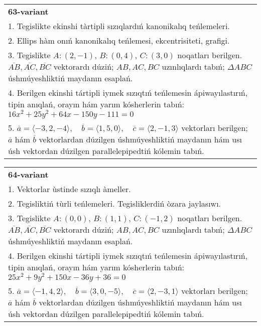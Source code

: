 \documentclass{article}
\begin{document}
\begin{tabular}{m{17cm}}
\textbf{63-variant}\\
1. Tegislikte ekinshi tàrtipli sızıqlardıń kanonikalıq teńlemeleri.\\

2. Ellips hàm onıń kanonikalıq teńlemesi, ekcentrisiteti, grafigi.\\

3. Tegislikte $A: (2, -1)$, $B: (0, 4)$, $C: (3, 0)$ noqatları berilgen. $\overline{AB}, \overline{AC}, \overline{BC}$ vektorardı dúziń; $AB, AC, BC$ uzınlıqlardı tabıń; $\Delta ABC$ úshmúyeshliktiń maydanın esaplań. \\

4. Berilgen ekinshi tártipli iymek sızıqtıń teńlemesin ápiwayılastırıń, tipin anıqlań, orayın hám yarım kósherlerin tabıń: $16x^2+25y^2+64x-150y-111=0$\\

5. \(\overline{a} = \langle -3, 2, -4 \rangle, \quad \overline{b} = \langle 1, 5, 0 \rangle, \quad \overline{c} = \langle 2, -1, 3 \rangle\) vektorları berilgen; \(\overline{a}\) hám \(\overline{b}\) vektorlardan dúzilgen úshmúyeshliktiń maydanın hám usı úsh vektordan dúzilgen parallelepipedtiń kólemin tabıń.
\end{tabular}
\vspace{1cm}


\begin{tabular}{m{17cm}}
\textbf{64-variant}\\
1. Vektorlar ùstinde sızıqlı àmeller.\\

2. Tegisliktiń tùrli teńlemeleri. Tegisliklerdiń òzara jaylasıwı.\\

3. Tegislikte $A: (0, 0)$, $B: (1, 1)$, $C: (-1, 2)$ noqatları berilgen. $\overline{AB}, \overline{AC}, \overline{BC}$ vektorardı dúziń; $AB, AC, BC$ uzınlıqlardı tabıń; $\Delta ABC$ úshmúyeshliktiń maydanın esaplań. \\

4. Berilgen ekinshi tártipli iymek sızıqtıń teńlemesin ápiwayılastırıń, tipin anıqlań, orayın hám yarım kósherlerin tabıń: $25x^2+9y^2+150x-36y+36=0$\\

5. \(\overline{a} = \langle -1, 4, 2 \rangle, \quad \overline{b} = \langle 3, 0, -5 \rangle, \quad \overline{c} = \langle 2, -3, 1 \rangle\) vektorları berilgen; \(\overline{a}\) hám \(\overline{b}\) vektorlardan dúzilgen úshmúyeshliktiń maydanın hám usı úsh vektordan dúzilgen parallelepipedtiń kólemin tabıń.
\end{tabular}
\vspace{1cm}
\end{document}
